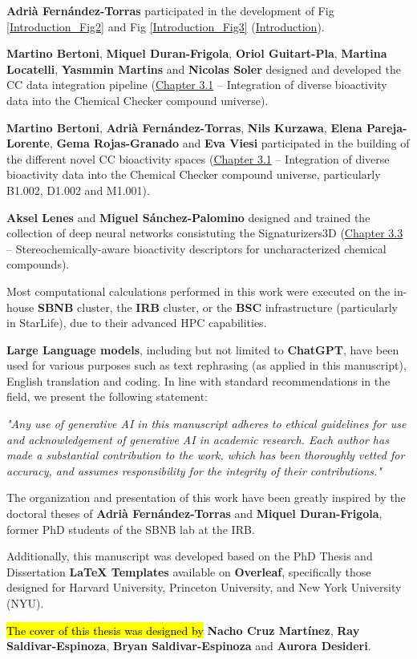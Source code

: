 

\textbf{Adrià Fernández-Torras} participated in the development of Fig \ref{Introduction_Fig2} and Fig \ref{Introduction_Fig3} (\hyperref[introduction]{Introduction}).

\textbf{Martino Bertoni}, \textbf{Miquel Duran-Frigola}, \textbf{Oriol Guitart-Pla}, \textbf{Martina Locatelli}, \textbf{Yasmmin Martins} and \textbf{Nicolas Soler} designed and developed the CC data integration pipeline (\hyperref[Chapter_3.1]{Chapter 3.1} -- Integration of diverse bioactivity data into the Chemical Checker compound universe).

\textbf{Martino Bertoni}, \textbf{Adrià Fernández-Torras}, \textbf{Nils Kurzawa}, \textbf{Elena Pareja-Lorente}, \textbf{Gema Rojas-Granado} and \textbf{Eva Viesi} participated in the building of the different novel CC bioactivity spaces (\hyperref[Chapter_3.1]{Chapter 3.1} -- Integration of diverse bioactivity data into the Chemical Checker compound universe, particularly B1.002, D1.002 and M1.001).

\textbf{Aksel Lenes} and \textbf{Miguel Sánchez-Palomino} designed and trained the collection of deep neural networks consistuting the Signaturizers3D (\hyperref[Chapter_3.3]{Chapter 3.3} -- Stereochemically-aware bioactivity descriptors for uncharacterized chemical compounds).

Most computational calculations performed in this work were executed on the in-house \textbf{SBNB} cluster, the \textbf{IRB} cluster, or the \textbf{BSC} infrastructure (particularly in StarLife), due to their advanced HPC capabilities.

\textbf{Large Language models}, including but not limited to \textbf{ChatGPT}, have been used for various purposes such as text rephrasing (as applied in this manuscript), English translation and coding. In line with standard recommendations in the field\cite{porsdam_mann_guidelines_2024}, we present the following statement:

\textit{"Any use of generative AI in this manuscript adheres to ethical guidelines for use and acknowledgement of generative AI in academic research. Each author has made a substantial contribution to the work, which has been thoroughly vetted for accuracy, and assumes responsibility for the integrity of their contributions."}

The organization and presentation of this work have been greatly inspired by the doctoral theses of \textbf{Adrià Fernández-Torras} and \textbf{Miquel Duran-Frigola}, former PhD students of the SBNB lab at the IRB. 

Additionally, this manuscript was developed based on the PhD Thesis and Dissertation \textbf{LaTeX Templates} available on \textbf{Overleaf}, specifically those designed for Harvard University, Princeton University, and New York University (NYU).

\hl{The cover of this thesis was designed by} \textbf{Nacho Cruz Martínez}, \textbf{Ray Saldivar-Espinoza}, \textbf{Bryan Saldivar-Espinoza} and \textbf{Aurora Desideri}. 